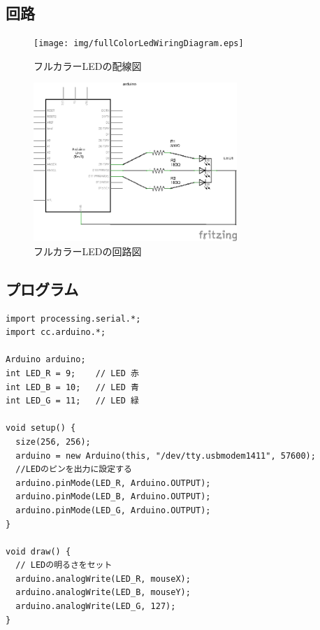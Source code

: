 \documentclass[11pt,a4paper]{jarticle}
\begin{document}
\subsection*{回路}
\begin{figure}[h!]
 \begin{minipage}{0.5\columnwidth}
  \centering
  \texttt{[image: img/fullColorLedWiringDiagram.eps]}
  \caption{フルカラーLEDの配線図}
  \label{circuit}
 \end{minipage}
 \begin{minipage}{0.5\columnwidth}
  \centering
  \includegraphics[height=60mm]{img/fullColorLedCircuit.eps}
  \caption{フルカラーLEDの回路図}
 \end{minipage}
\end{figure}

\subsection*{プログラム}
\begin{lstlisting}
import processing.serial.*;
import cc.arduino.*;
 
Arduino arduino;
int LED_R = 9;    // LED 赤
int LED_B = 10;   // LED 青
int LED_G = 11;   // LED 緑

void setup() {
  size(256, 256);
  arduino = new Arduino(this, "/dev/tty.usbmodem1411", 57600);
  //LEDのピンを出力に設定する
  arduino.pinMode(LED_R, Arduino.OUTPUT);
  arduino.pinMode(LED_B, Arduino.OUTPUT);
  arduino.pinMode(LED_G, Arduino.OUTPUT);
}

void draw() {
  // LEDの明るさをセット
  arduino.analogWrite(LED_R, mouseX);
  arduino.analogWrite(LED_B, mouseY);
  arduino.analogWrite(LED_G, 127);
}
\end{lstlisting}
\end{document}
